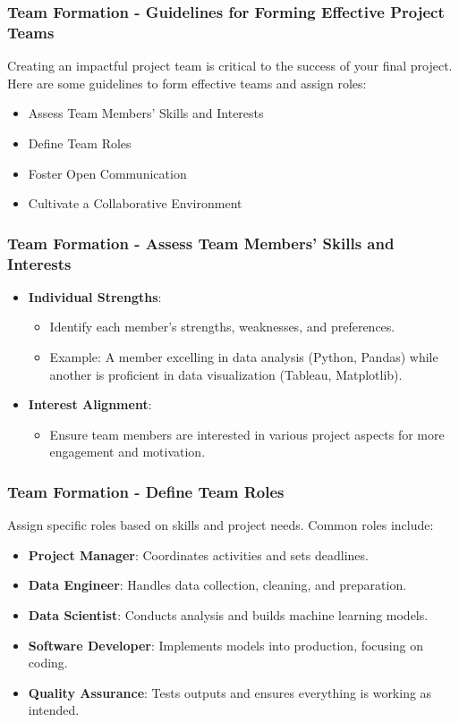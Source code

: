 \documentclass[aspectratio=169]{beamer}
\begin{document}
\begin{frame}[fragile]
    \frametitle{Team Formation - Guidelines for Forming Effective Project Teams}
    Creating an impactful project team is critical to the success of your final project. 
    Here are some guidelines to form effective teams and assign roles:
    \begin{itemize}
        \item Assess Team Members' Skills and Interests
        \item Define Team Roles
        \item Foster Open Communication
        \item Cultivate a Collaborative Environment
    \end{itemize}
\end{frame}

\begin{frame}[fragile]
    \frametitle{Team Formation - Assess Team Members' Skills and Interests}
    \begin{itemize}
        \item \textbf{Individual Strengths}:
            \begin{itemize}
                \item Identify each member's strengths, weaknesses, and preferences.
                \item Example: A member excelling in data analysis (Python, Pandas) while another is proficient in data visualization (Tableau, Matplotlib).
            \end{itemize}
        \item \textbf{Interest Alignment}:
            \begin{itemize}
                \item Ensure team members are interested in various project aspects for more engagement and motivation.
            \end{itemize}
    \end{itemize}
\end{frame}

\begin{frame}[fragile]
    \frametitle{Team Formation - Define Team Roles}
    Assign specific roles based on skills and project needs. Common roles include:
    \begin{itemize}
        \item \textbf{Project Manager}: Coordinates activities and sets deadlines.
        \item \textbf{Data Engineer}: Handles data collection, cleaning, and preparation.
        \item \textbf{Data Scientist}: Conducts analysis and builds machine learning models.
        \item \textbf{Software Developer}: Implements models into production, focusing on coding.
        \item \textbf{Quality Assurance}: Tests outputs and ensures everything is working as intended.
    \end{itemize}
\end{frame}
\end{document}
